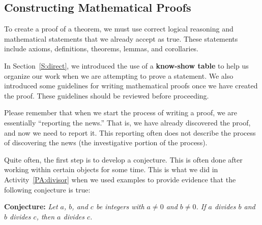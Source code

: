 \subsection*{Constructing Mathematical Proofs}
To create a proof of a theorem, we must use correct logical reasoning and mathematical statements that we already accept as true.  These statements include axioms, definitions, theorems, lemmas, and corollaries.

In Section~\ref{S:direct}, we introduced the use of a \textbf{know-show table}
%
 to help us organize our work when we are attempting to prove a statement.  We also introduced some guidelines for writing mathematical proofs once we have created the proof.  These guidelines should be reviewed before proceeding.

Please remember that when we start the process of writing a proof, we are essentially ``reporting the news.''  That is, we have already discovered the proof, and now we need to report it.  This reporting often does not describe the process of discovering the news (the investigative portion of the process).

Quite often, the first step is to develop a conjecture.  This is often done after working within certain objects for some time.  This is what we did in \typeu Activity~\ref*{PA:divisor} when we used examples to provide evidence that the following conjecture is true:

\newpar
\setlength{\hangindent}{60pt}
\noindent
\textbf{Conjecture:} \emph{Let $a$, $b$, and $c$ be integers with $a \ne 0$ and $b \ne 0$.  If $a$ divides $b$ and $b$ divides $c$, then $a$ divides $c$.}


%


